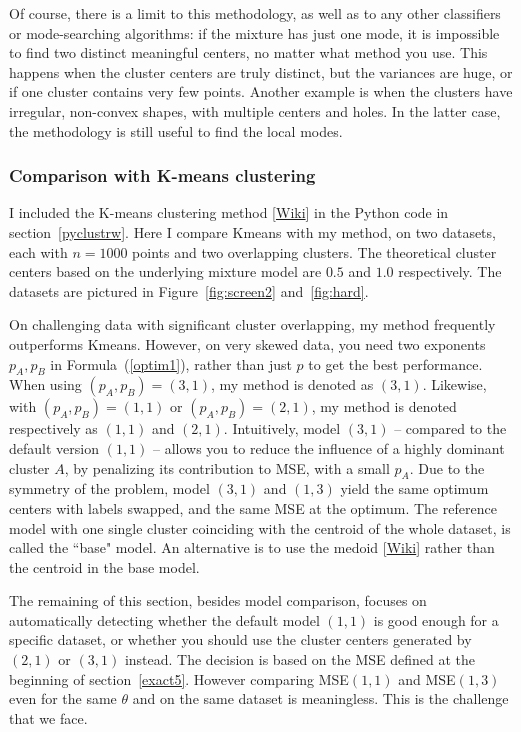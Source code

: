 \documentclass[oneside,10pt]{book}
\begin{document}
Of course, there is a limit to this methodology, as well as to any other classifiers or mode-searching algorithms: if the mixture
 has just one mode, it is impossible to find two distinct meaningful centers, no matter what method you use. This happens when the cluster centers are truly distinct, but the variances
are huge, or if one cluster contains very few points. Another example is when the clusters have irregular, non-convex shapes, with multiple centers and holes. In the latter case,
 the methodology is still useful to find the local modes.

 \subsubsection{Comparison with K-means clustering}\label{kmeans}

I included the \textcolor{index}{K-means clustering} method [\href{https://en.wikipedia.org/wiki/K-means_clustering}{Wiki}] in the Python code in section~\ref{pyclustrw}. Here I compare Kmeans with my method, on two datasets, each
 with $n=1000$ points and two overlapping clusters. The theoretical cluster centers based on the underlying mixture model are $0.5$ and $1.0$ respectively.
The datasets are pictured in Figure~\ref{fig:screen2} and~\ref{fig:hard}.

On challenging data with significant cluster overlapping, my method frequently outperforms Kmeans. However, on very skewed data, you
 need two exponents $p_A, p_B$ in Formula~(\ref{optim1}), rather than just $p$ to get the best performance. When using $(p_A, p_B)=(3,1)$, my method is denoted as $(3,1)$. Likewise, with $(p_A, p_B)=(1,1)$ or $(p_A, p_B)=(2,1)$, my method is denoted respectively as $(1, 1)$ and $(2,1)$.
Intuitively, model $(3, 1)$ -- compared to the default version $(1, 1)$ -- allows you to  reduce the influence of a highly dominant cluster $A$, by penalizing its contribution to MSE, with a small $p_A$. Due to the symmetry of the problem, model $(3, 1)$ and $(1, 3)$ yield the same optimum centers
with labels swapped,
and the same MSE at the optimum.
  The reference model with one
 single cluster coinciding with the centroid of the whole dataset, is called the ``base" model. An alternative is to use
the \textcolor{index}{medoid} [\href{https://en.wikipedia.org/wiki/Medoid}{Wiki}] rather than the centroid in the base model.

The remaining of this section, besides model comparison, focuses on automatically detecting whether the default model $(1, 1)$ is good enough for a
specific dataset,   or whether you should use the cluster centers generated by $(2,1)$ or $(3, 1)$ instead. The decision is based on
 the MSE defined at the beginning of section~\ref{exact5}. However comparing MSE$(1,1)$  and
MSE$(1, 3)$ even for the same $\theta$ and on the same dataset is meaningless. This is the challenge that we face.
\end{document}
